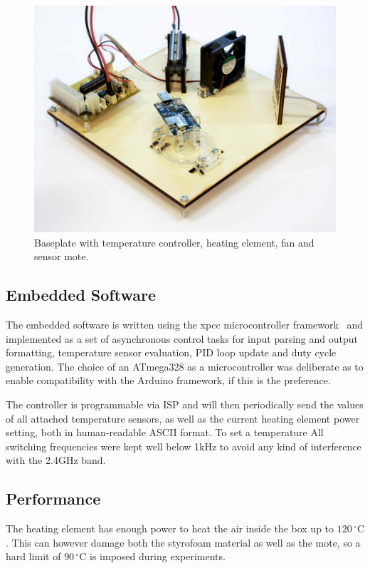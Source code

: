 \begin{figure}[hb]
	\centering
    \includegraphics[width=1\columnwidth]{figures/temperature_box}
	\caption{Baseplate with temperature controller, heating element, fan and sensor mote.}
    \label{fig:box_hardware_picture}
\end{figure}


\subsection{Embedded Software}

The embedded software is written using the xpcc microcontroller framework~\cite{xpcc.io} and implemented as a set of asynchronous control tasks for input parsing and output formatting, temperature sensor evaluation, \acs{PID} loop update and duty cycle generation.
The choice of an ATmega328 as a microcontroller was deliberate as to enable compatibility with the Arduino framework, if this is the preference.

The controller is programmable via \ac{ISP} and will then periodically send the values of all attached temperature sensors, as well as the current heating element power setting, both in human-readable ASCII format.
To set a temperature
All switching frequencies were kept well below 1kHz to avoid any kind of interference with the 2.4GHz band.


\subsection{Performance}

The heating element has enough power to heat the air inside the box up to $120\,^{\circ}\mathrm{C}$.
This can however damage both the styrofoam material as well as the mote, so a hard limit of $90\,^{\circ}\mathrm{C}$ is imposed during experiments.

